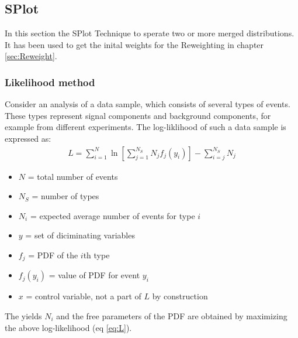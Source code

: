 \documentclass[english]{uzhpub}
\begin{document}
 \subsection{SPlot}
 In this section the SPlot Technique to sperate two or more merged distributions. It has been used to get the inital weights for the Reweighting in chapter \ref{sec:Reweight}.

 \subsubsection{Likelihood method}
 Consider an analysis of a data sample, which consists of several types of events. These types represent signal components and background components, for example from different experiments. The log-liklihood of such a data sample is expressed as:
 \begin{align}
  L = \sum_{i=1}^{N} \ln \left[ \sum_{j=1}^{N_S} N_j f_j (y_i) \right] - \sum_{i=j}^{N_S} N_j \label{eq:L}
 \end{align}

 \begin{itemize}
  \item $N$ = total number of events \\
  \item $N_S$ = number of types \\
  \item $N_i$ = expected average number of events for type $i$ \\
  \item $y$ = set of diciminating variables \\
  \item $f_j$ = PDF of the $i$th type \\
  \item $f_j(y_i)$ = value of PDF for event $y_i$ \\
  \item $x$ = control variable, not a part of $L$ by construction
 \end{itemize}
 The yields $N_i$ and the free parameters of the PDF are obtained by maximizing the above log-likelihood (eq \ref{eq:L}).
\end{document}

